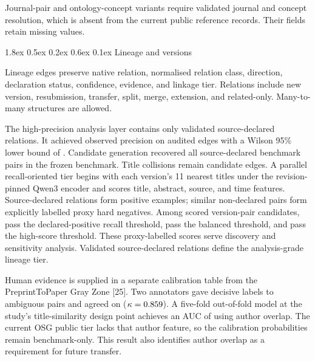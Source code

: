 \documentclass[
  10pt,
]{article}
\makeatletter
\renewcommand\subsubsection{\@startsection{subsubsection}{3}{\z@}%
  {1.8ex \@plus 0.5ex \@minus 0.2ex}%
  {0.6ex \@plus 0.1ex}%
  {\normalfont\normalsize\sffamily\bfseries\color{OSGInk}}}
\makeatother
\begin{document}
Journal-pair and ontology-concept variants require validated journal and
concept resolution, which is absent from the current public reference
records. Their fields retain missing values.

\subsubsection{Lineage and versions}\label{54-lineage-and-versions}

Lineage edges preserve native relation, normalised relation class,
direction, declaration status, confidence, evidence, and linkage tier.
Relations include new version, resubmission, transfer, split, merge,
extension, and related-only. Many-to-many structures are allowed.

The high-precision analysis layer contains only validated
source-declared relations. It achieved observed precision
\OSGClaimLineagePrecision{} on \OSGClaimLineageAuditN{} audited edges with a
Wilson 95\% lower bound of \OSGClaimLineagePrecisionLower{}.
Candidate generation recovered all source-declared benchmark pairs in
the frozen benchmark. Title collisions remain candidate edges. A
parallel recall-oriented tier begins with each version's 11
nearest titles under the revision-pinned Qwen3 encoder and scores title,
abstract, source, and time features. Source-declared relations form
positive examples; similar non-declared pairs form explicitly labelled
proxy hard negatives. Among \OSGClaimProbabilisticLinkageCandidates{} scored
version-pair candidates, \OSGClaimProbabilisticHighRecallPairs{}
pass the declared-positive recall threshold,
\OSGClaimProbabilisticBalancedPairs{} pass the balanced threshold, and
\OSGClaimProbabilisticHighPrecisionPairs{} pass the high-score threshold.
These proxy-labelled scores serve discovery and sensitivity analysis.
Validated source-declared relations define the analysis-grade lineage
tier.

Human evidence is supplied in a separate calibration table from the
PreprintToPaper Gray Zone {[}25{]}. Two annotators gave decisive labels
to \OSGClaimHumanLineageDecisivePairs{} ambiguous pairs and agreed on
\OSGClaimHumanLineageConsensusPairs{}
($\kappa=0.859{}$). A five-fold
out-of-fold model at the study's title-similarity design point achieves
an AUC of \OSGClaimHumanLineageOofAuc{} using author overlap. The current
OSG public tier lacks that author feature, so the calibration
probabilities remain benchmark-only. This result also identifies author
overlap as a requirement for future transfer.
\end{document}
